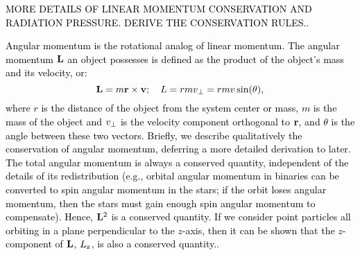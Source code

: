 \documentclass[main.tex]{subfiles}
\begin{document}
\begin{tcolorbox}[sharp corners, colback=green!30, colframe=green!80!blue,title=Box \refstepcounter{educhap2}\label{boxchap2:linII}\ref{boxchap2:linII} -- Linear Momentum II]
\par \textcolor{black} {MORE DETAILS OF LINEAR MOMENTUM CONSERVATION AND RADIATION PRESSURE. DERIVE THE CONSERVATION RULES.}.  
\end{tcolorbox}

\begin{tcolorbox}[sharp corners, colback=blue!30, colframe=blue!80!blue, title=Box \refstepcounter{educhap2}\label{boxchap2:angI}\ref{boxchap2:angI} -- Angular Momentum I]
\par \textcolor{black} {Angular momentum is the rotational analog of linear momentum.  The angular momentum ${\mathbf{L}}$ an object possesses is defined as the product of the object's mass and its velocity, or:
\begin{equation}
{\mathbf{L}} = m{\mathbf{r}} \times {\mathbf{v}}; \quad L = rmv_{\rm \perp} = rmv \sin(\theta),
\end{equation}
where $r$ is the distance of the object from the system center or mass, $m$ is the mass of the object and $v_{\rm \perp}$ is the velocity component orthogonal to ${\mathbf{r}}$, and $\theta$ is the angle between these two vectors. 
Briefly, we describe qualitatively the conservation of angular momentum, deferring a more detailed derivation to later.  The total angular momentum is always a conserved quantity, independent of the details of its redistribution (e.g., orbital angular momentum in binaries can be converted to spin angular momentum in the stars; if the orbit loses angular momentum, then the stars must gain enough spin angular momentum to compensate).  Hence, ${\mathbf{L}}^2$ is a conserved quantity.  If we consider point particles all orbiting in a plane perpendicular to the $z$-axis, then it can be shown that the $z$-component of ${\mathbf{L}}$, ${L}_{\rm z}$, is also a conserved quantity.}.  
\end{tcolorbox}
\end{document}
